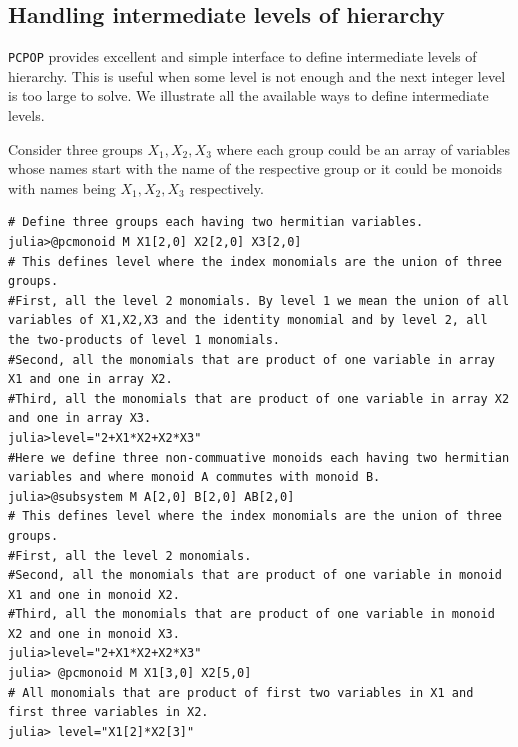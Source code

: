 \subsection{Handling intermediate levels of hierarchy}
\texttt{PCPOP} provides excellent and simple interface to define intermediate levels of hierarchy. This is useful when some level is not enough and the next integer level is too large to solve. We illustrate all the available ways to define intermediate levels.

Consider three groups $X_1,X_2,X_3$ where each group could be an array of variables whose names start with the name of the respective group or it could be monoids with names being $X_1,X_2,X_3$ respectively.   
\begin{lstlisting}[style=code, mathescape=true]
# Define three groups each having two hermitian variables.
julia>@pcmonoid M X1[2,0] X2[2,0] X3[2,0]
# This defines level where the index monomials are the union of three groups.
#First, all the level 2 monomials. By level 1 we mean the union of all variables of X1,X2,X3 and the identity monomial and by level 2, all the two-products of level 1 monomials.
#Second, all the monomials that are product of one variable in array X1 and one in array X2.
#Third, all the monomials that are product of one variable in array X2 and one in array X3.
julia>level="2+X1*X2+X2*X3"
#Here we define three non-commuative monoids each having two hermitian variables and where monoid A commutes with monoid B.
julia>@subsystem M A[2,0] B[2,0] AB[2,0]
# This defines level where the index monomials are the union of three groups.
#First, all the level 2 monomials. 
#Second, all the monomials that are product of one variable in monoid X1 and one in monoid X2.
#Third, all the monomials that are product of one variable in monoid X2 and one in monoid X3.
julia>level="2+X1*X2+X2*X3"
julia> @pcmonoid M X1[3,0] X2[5,0]
# All monomials that are product of first two variables in X1 and first three variables in X2.
julia> level="X1[2]*X2[3]"
\end{lstlisting}